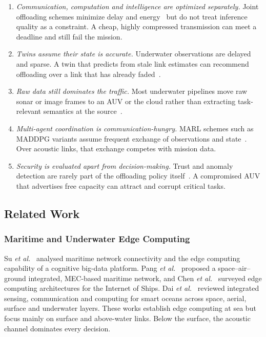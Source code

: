 \documentclass[lettersize,journal]{IEEEtran}
\begin{document}
\begin{enumerate}
\item \emph{Communication, computation and intelligence are optimized separately.} Joint offloading schemes minimize delay and energy~\cite{shu2026offload,chen2025ios} but do not treat inference quality as a constraint. A cheap, highly compressed transmission can meet a deadline and still fail the mission.
\item \emph{Twins assume their state is accurate.} Underwater observations are delayed and sparse. A twin that predicts from stale link estimates can recommend offloading over a link that has already faded~\cite{song2025dtna}.
\item \emph{Raw data still dominates the traffic.} Most underwater pipelines move raw sonar or image frames to an AUV or the cloud rather than extracting task-relevant semantics at the source~\cite{wu2024inc,dai2022survey}.
\item \emph{Multi-agent coordination is communication-hungry.} MARL schemes such as MADDPG variants assume frequent exchange of observations and state~\cite{lin2025madac}. Over acoustic links, that exchange competes with mission data.
\item \emph{Security is evaluated apart from decision-making.} Trust and anomaly detection are rarely part of the offloading policy itself~\cite{ahmad2026survey}. A compromised AUV that advertises free capacity can attract and corrupt critical tasks.
\end{enumerate}

\subsection{Related Work}
\subsubsection{Maritime and Underwater Edge Computing}
Su \emph{et al.}~\cite{su2020maritime} analysed maritime network connectivity and the edge computing capability of a cognitive big-data platform. Pang \emph{et al.}~\cite{pang2020sagin} proposed a space--air--ground integrated, MEC-based maritime network, and Chen \emph{et al.}~\cite{chen2025ios} surveyed edge computing architectures for the Internet of Ships. Dai \emph{et al.}~\cite{dai2022survey} reviewed integrated sensing, communication and computing for smart oceans across space, aerial, surface and underwater layers. These works establish edge computing at sea but focus mainly on surface and above-water links. Below the surface, the acoustic channel dominates every decision.
\end{document}
